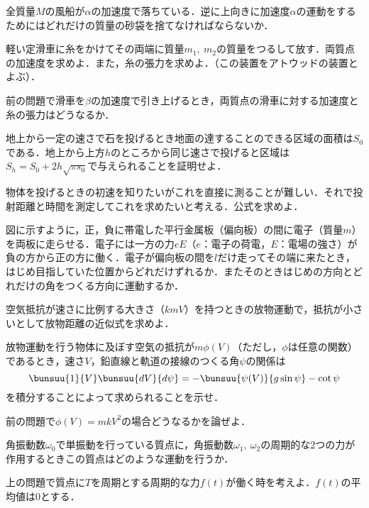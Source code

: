 \begin{enumerate}[label=\textbf{[\arabic*]}, labelsep=10pt, leftmargin=23pt]
	\item 全質量$M$の風船が$\alpha$の加速度で落ちている．逆に上向きに加速度$\alpha$の運動をするためにはどれだけの質量の砂袋を捨てなければならないか．
	\item 軽い定滑車に糸をかけてその両端に質量$m_1,\ m_2$の質量をつるして放す．両質点の加速度を求めよ．また，糸の張力を求めよ．（この装置をアトウッドの装置とよぶ）．
	\item 前の問題で滑車を$\beta$の加速度で引き上げるとき，両質点の滑車に対する加速度と糸の張力はどうなるか．
	\item 地上から一定の速さで石を投げるとき地面の達することのできる区域の面積は$S_0$である．地上から上方$h$のところから同じ速さで投げると区域は$S_h = S_0 + 2h\sqrt{\pi s_0}$で与えられることを証明せよ．
	\item 物体を投げるときの初速を知りたいがこれを直接に測ることが難しい．それで投射距離と時間を測定してこれを求めたいと考える．公式を求めよ．
	\item 図に示すように，正，負に帯電した平行金属板（偏向板）の間に電子（質量$m$）を両板に走らせる．電子には一方の力$eE$（$e$：電子の荷電，$E$：電場の強さ）が負の方から正の方に働く．電子が偏向板の間を$l$だけ走ってその端に来たとき，はじめ目指していた位置からどれだけずれるか．またそのときはじめの方向とどれだけの角をつくる方向に運動するか．
	\item 空気抵抗が速さに比例する大きさ（$kmV$）を持つときの放物運動で，抵抗が小さいとして放物距離の近似式を求めよ．
	\item 放物運動を行う物体に及ぼす空気の抵抗が$m\phi(V)$（ただし，$\phi$は任意の関数）であるとき，速さ$V$，鉛直線と軌道の接線のつくる角$\psi$の関係は
		\begin{equation*}
			\bunsuu{1}{V}\bunsuu{dV}{d\psi} = -\bunsuu{\psi(V)}{g\sin \psi} - \cot \psi
		\end{equation*}
		を積分することによって求められることを示せ．
	\item 前の問題で$\phi(V) = mkV^2$の場合どうなるかを論ぜよ．
	\item 角振動数$\omega_0$で単振動を行っている質点に，角振動数$\omega_1,\ \omega_2$の周期的な2つの力が作用するときこの質点はどのような運動を行うか．
	\item 上の問題で質点に$T$を周期とする周期的な力$f(t)$が働く時を考えよ．$f(t)$の平均値は$0$とする．
\end{enumerate}



